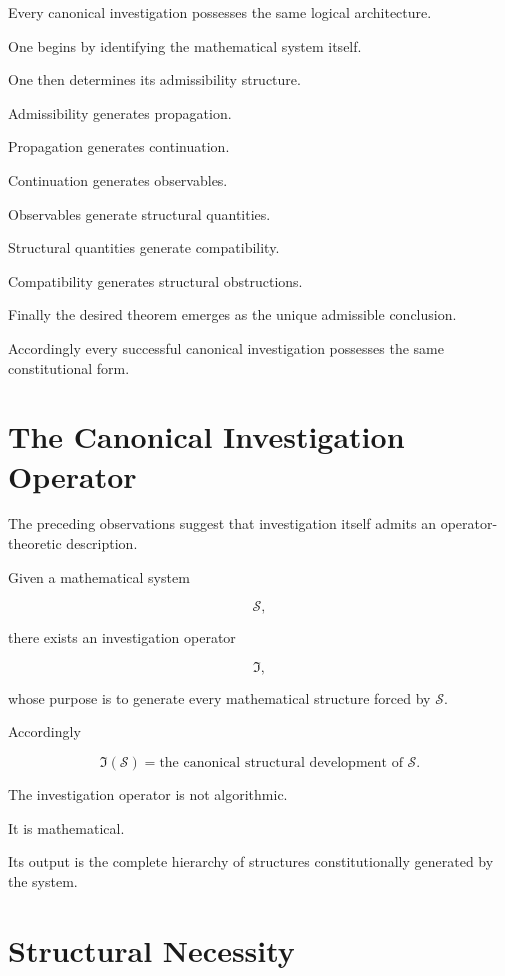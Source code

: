 \documentclass[13pt,openany]{book}
\theoremstyle{plain}
\theoremstyle{definition}
\begin{document}
Every canonical investigation possesses the same logical architecture.

One begins by identifying the mathematical system itself.

One then determines its admissibility structure.

Admissibility generates propagation.

Propagation generates continuation.

Continuation generates observables.

Observables generate structural quantities.

Structural quantities generate compatibility.

Compatibility generates structural obstructions.

Finally the desired theorem emerges as the unique admissible conclusion.

Accordingly every successful canonical investigation possesses the same
constitutional form.

\section{The Canonical Investigation Operator}

The preceding observations suggest that investigation itself admits an
operator-theoretic description.

Given a mathematical system

\[
\mathcal{S},
\]

there exists an investigation operator

\[
\mathfrak{I},
\]

whose purpose is to generate every mathematical structure forced by
\(\mathcal{S}\).

Accordingly

\[
\boxed{
\mathfrak{I}(\mathcal{S})
=
\text{the canonical structural development of }\mathcal{S}.
}
\]

The investigation operator is not algorithmic.

It is mathematical.

Its output is the complete hierarchy of structures constitutionally generated
by the system.

\section{Structural Necessity}
\end{document}
